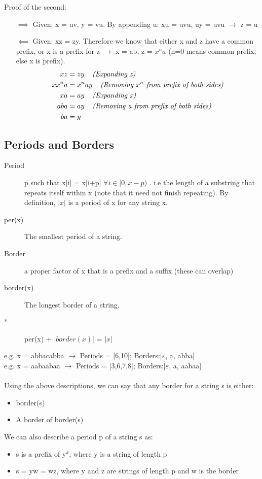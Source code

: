 Proof of the second:
\begin{enumerate}
    \item [$\implies$] Given: x = uv, y = vu. By appending u: xu = uvu, uy = uvu $\rightarrow$ z = u
    \item [$\impliedby$] Given: xz = zy. Therefore we know that either x and z have a common prefix, or x is a prefix for z $\rightarrow$ x = ab, z = $x^{n}a$ (n=0 means common prefix, else x is prefix). 
    \begin{align}
        xz &= zy \; \; \; \; \emph{(Expanding z)}\nonumber \\
        xx^{n}a &= x^{n}ay \; \; \; \; \emph{(Removing $x^{n}$ from prefix of both sides)}\nonumber \\
        xa &= ay \; \; \; \; \emph{(Expanding x)} \nonumber \\
        aba &= ay \; \; \; \; \emph{(Removing a from prefix of both sides)} \nonumber \\
        ba &= y \nonumber
    \end{align}
\end{enumerate}

\subsection{Periods and Borders}
\begin{description}
    \item[Period] p such that x[i] = x[i+p] $\forall i \in [0,x-p)$ . i.e the length of a substring that repeats itself within x (note that it need not finish repeating). By definition, $|x|$ is a period of x for any string x.
    \item[per(x)] The smallest period of a string.
    \item[Border] a proper factor of x that is a prefix and a suffix (these can overlap)
    \item[border(x)] The longest border of a string.
    \item[*] per(x) + $|border(x)|$ = $|x|$
\end{description}
e.g. x = abbacabba $\rightarrow$ Periods = [6,10]; Borders:[$\varepsilon$, a, abba] \\
e.g. x = aabaabaa $\rightarrow$ Periods = [3,6,7,8]; Borders:[$\varepsilon$, a, aabaa] \\ \\
Using the above descriptions, we can say that any border for a string s is either:
\begin{itemize}
    \item border(s)
    \item A border of border(s)
\end{itemize}
We can also describe a period p of a string s as:
\begin{itemize}
    \item s is a prefix of y$^k$, where y is a string of length p
    \item s = yw = wz, where y and z are strings of length p and w is the border
\end{itemize}